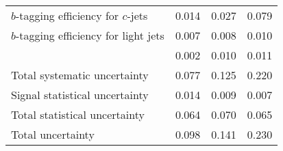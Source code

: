 \begin{table}[htb]
\begin{center}
\begin{tabular}{l c c c}
    $b$-tagging efficiency for $c$-jets        &	0.014	&	0.027	&	0.079	\\
    $b$-tagging efficiency for light jets      &	0.007	&	0.008	&	0.010	\\
    \MET	                                   &	0.002	&	0.010	&	0.011	\\
    \midrule
    Total systematic uncertainty        	   &	0.077	&	0.125	&	0.220	\\
    \midrule
    Signal statistical uncertainty	           &	0.014	&	0.009	&	0.007	\\
    \midrule
    Total statistical uncertainty	           &	0.064	&	0.070	&	0.065	\\
    \midrule \midrule
    Total uncertainty           	           &	0.098	&	0.141	&	0.230	\\
    \bottomrule \bottomrule
  \end{tabular}
  \end{center}
  \label{tqX:rankingbreakuX}
  \end{table}

